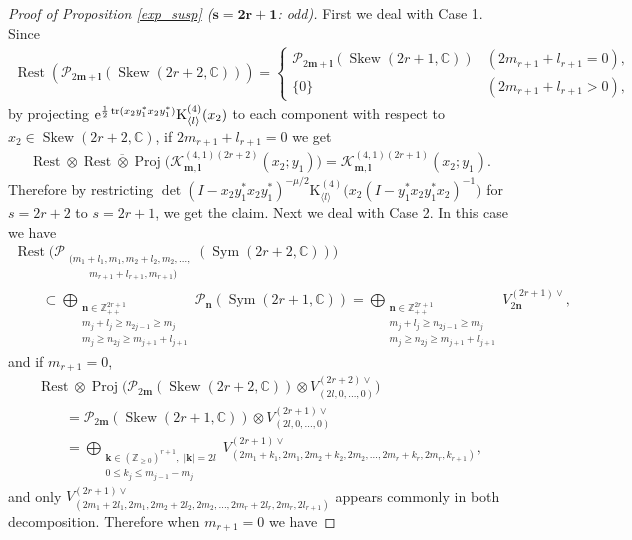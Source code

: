 \documentclass[pdftex]{sigma}
\numberwithin{equation}{section}
\newcommand{\bk}{\mathbf{k}}
\newcommand{\bl}{\mathbf{l}}
\newcommand{\bm}{\mathbf{m}}
\newcommand{\bn}{\mathbf{n}}
\newcommand{\BZ}{\mathbb{Z}}
\newcommand{\BC}{\mathbb{C}}
\newcommand{\cK}{\mathcal{K}}
\newcommand{\cP}{\mathcal{P}}
\newcommand{\rK}{\mathrm{K}}
\newcommand{\tr}{\operatorname{tr}}
\newcommand{\Proj}{\operatorname{Proj}}
\newcommand{\Sym}{\operatorname{Sym}}
\newcommand{\Skew}{\operatorname{Skew}}
\newcommand{\Rest}{\operatorname{Rest}}
\begin{document}
\begin{proof}[Proof of Proposition \ref{exp_susp} ($\boldsymbol{s=2r+1}$: odd)]
First we deal with Case 1. Since
\begin{gather*} \Rest(\cP_{2\bm+\bl}(\Skew(2r+2,\BC)))=\begin{cases}
\cP_{2\bm+\bl}(\Skew(2r+1,\BC)) & (2m_{r+1}+l_{r+1}=0), \\ \{0\} & (2m_{r+1}+l_{r+1}>0), \end{cases} \end{gather*}
by projecting ${\rm e}^{\frac{1}{2}\tr(x_2y_1^*x_2y_1^*)}\rK_{\langle l\rangle}^{(4)}(x_2)$ to each component
with respect to $x_2\in\Skew(2r+2,\BC)$, if $2m_{r+1}+l_{r+1}=0$ we get
\begin{gather*} \Rest\otimes\overline{\Rest\otimes\Proj}\big(\cK_{\bm,\bl}^{(4,1)(2r+2)}(x_2;y_1)\big)=\cK_{\bm,\bl}^{(4,1)(2r+1)}(x_2;y_1). \end{gather*}
Therefore by restricting $\det(I-x_2y_1^*x_2y_1^*)^{-\mu/2}\rK_{\langle l\rangle}^{(4)}\big(x_2(I-y_1^*x_2y_1^*x_2)^{-1}\big)$
for $s=2r+2$ to $s=2r+1$, we get the claim. Next we deal with Case 2. In this case we have
\begin{gather*}
 \Rest\big(\cP_{\substack{(m_1+l_1,m_1,m_2+l_2,m_2,\ldots,\\\hspace{25pt} m_{r+1}+l_{r+1},m_{r+1})}}(\Sym(2r+2,\BC))\big) \\
\qquad{} \subset\bigoplus_{\substack{\bn\in\BZ_{++}^{2r+1}\\ m_j+l_j\ge n_{2j-1}\ge m_j\\ m_j\ge n_{2j}\ge m_{j+1}+l_{j+1}}}\cP_\bn(\Sym(2r+1,\BC))
=\bigoplus_{\substack{\bn\in\BZ_{++}^{2r+1}\\ m_j+l_j\ge n_{2j-1}\ge m_j\\ m_j\ge n_{2j}\ge m_{j+1}+l_{j+1}}}V_{2\bn}^{(2r+1)\vee},
\end{gather*}
and if $m_{r+1}=0$,
\begin{gather*}
 \Rest\otimes\Proj\big(\cP_{2\bm}(\Skew(2r+2,\BC))\otimes V_{(2l,0,\ldots,0)}^{(2r+2)\vee}\big)\\
\qquad{}=\cP_{2\bm}(\Skew(2r+1,\BC))\otimes V_{(2l,0,\ldots,0)}^{(2r+1)\vee}\\
\qquad{} =\bigoplus_{\substack{\bk\in(\BZ_{\ge 0})^{r+1},\; |\bk|=2l\\ 0\le k_j\le m_{j-1}-m_j }}
V_{(2m_1+k_1,2m_1,2m_2+k_2,2m_2,\ldots,2m_r+k_r,2m_r,k_{r+1})}^{(2r+1)\vee},
\end{gather*}
and only $V_{(2m_1+2l_1,2m_1,2m_2+2l_2,2m_2,\ldots,2m_r+2l_r,2m_r,2l_{r+1})}^{(2r+1)\vee}$ appears commonly in both decomposition. Therefore when $m_{r+1}=0$ we have

\end{proof}
\end{document}
